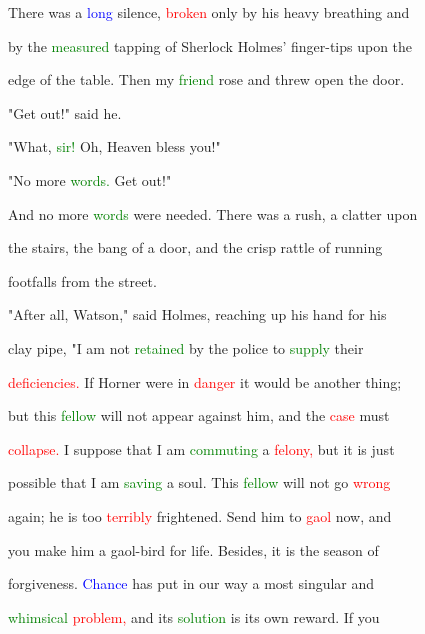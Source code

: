  There was a \textcolor{blue}{long} silence, \textcolor{red}{broken} only by his heavy breathing and

 by the \textcolor{green}{measured} tapping of Sherlock Holmes' finger-tips upon the

 edge of the table. Then my \textcolor{green}{friend} rose and threw open the door.



 "Get out!" said he.



 "What, \textcolor{green}{sir!} Oh, Heaven \textcolor{BurntOrange}{bless} you!"



 "No more \textcolor{green}{words.} Get out!"



 And no more \textcolor{green}{words} were needed. There was a rush, a clatter upon

 the stairs, the \textcolor{BurntOrange}{bang} of a door, and the \textcolor{BurntOrange}{crisp} rattle of running

 footfalls from the street.



 "After all, Watson," said Holmes, reaching up his hand for his

 clay pipe, "I am not \textcolor{green}{retained} by the \textcolor{BurntOrange}{police} to \textcolor{green}{supply} their

 \textcolor{red}{deficiencies.} If Horner were in \textcolor{red}{danger} it would be another thing;

 but this \textcolor{green}{fellow} will not appear against him, and the \textcolor{red}{case} must

 \textcolor{red}{collapse.} I suppose that I am \textcolor{green}{commuting} a \textcolor{red}{felony,} but it is just

 possible that I am \textcolor{green}{saving} a soul. This \textcolor{green}{fellow} will not go \textcolor{red}{wrong}

 again; he is too \textcolor{red}{terribly} \textcolor{BurntOrange}{frightened.} Send him to \textcolor{red}{gaol} now, and

 you make him a gaol-bird for life. Besides, it is the season of

 forgiveness. \textcolor{blue}{Chance} has put in our way a most singular and

 \textcolor{green}{whimsical} \textcolor{red}{problem,} and its \textcolor{green}{solution} is its own \textcolor{BurntOrange}{reward.} If you


